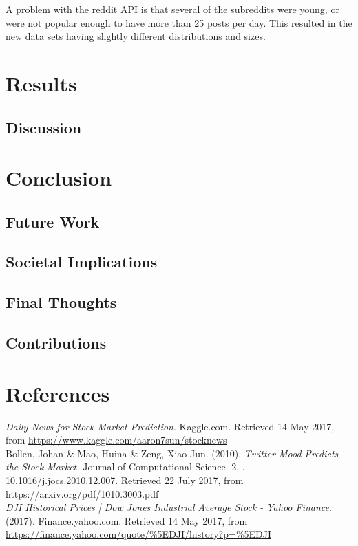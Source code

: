 \documentclass[11pt,a4paper]{article}
\begin{document}
A problem with the reddit API is that several of the subreddits were young, or were not popular enough to have more than 25 posts per day. This resulted in the new data sets having slightly different distributions and sizes.\\


\section{Results}
\subsection{Discussion}

\section{Conclusion}
\subsection{Future Work}
\subsection{Societal Implications}
\subsection{Final Thoughts}

\subsection{Contributions}


\section{References}


\textit{Daily News for Stock Market Prediction}. Kaggle.com. Retrieved 14 May 2017, from \url{https://www.kaggle.com/aaron7sun/stocknews}\\

Bollen, Johan \& Mao, Huina \& Zeng, Xiao-Jun. (2010). \textit{Twitter Mood Predicts the Stock Market.} Journal of Computational Science. 2. . 10.1016/j.jocs.2010.12.007. Retrieved 22 July 2017, from \url{https://arxiv.org/pdf/1010.3003.pdf}\\


\textit{DJI Historical Prices | Dow Jones Industrial Average Stock - Yahoo Finance}. (2017). Finance.yahoo.com. Retrieved 14 May 2017, from \url{https://finance.yahoo.com/quote/\%5EDJI/history?p=\%5EDJI}\\
\end{document}
